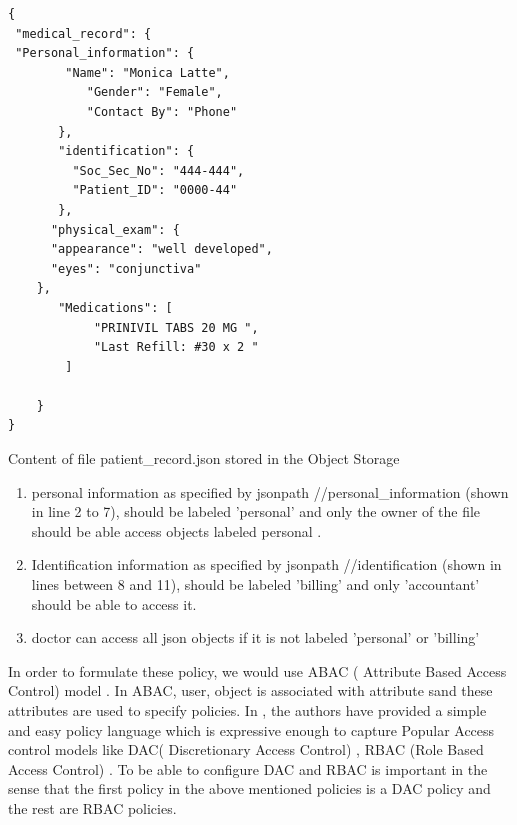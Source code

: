 \begin{listing}
\begin{verbatim}
{
 "medical_record": {
 "Personal_information": {
	    "Name": "Monica Latte",              
           "Gender": "Female",
           "Contact By": "Phone"
       },
       "identification": {
         "Soc_Sec_No": "444-444",
         "Patient_ID": "0000-44"
       },
      "physical_exam": {
	  "appearance": "well developed",
	  "eyes": "conjunctiva"
	},
       "Medications": [
            "PRINIVIL TABS 20 MG ",
            "Last Refill: #30 x 2 "
        ]    
      
    }
}

\end{verbatim}
\caption{ Content of file patient\_record.json stored in the Object Storage} 
\label{patient Record}
\end{listing}

\begin{enumerate}

  \item  personal information as specified by jsonpath //personal\_information (shown in line 2 to 7), should be labeled 'personal' and only the owner of the file should be able access objects labeled personal .

  \item Identification information as specified by jsonpath //identification (shown in lines between 8 and 11), should be labeled 'billing' and only 'accountant' should be able to access it.

  \item  doctor  can access all json objects if it is not labeled 'personal' or 'billing'
\end{enumerate}

In order to  formulate these policy, we would use ABAC ( Attribute Based Access Control) model \cite{abac}. In ABAC, user, object is associated with attribute sand these attributes are used to specify policies. In \cite{abac}, the authors have provided a simple and easy policy language which is expressive enough to capture Popular Access control models like  DAC( Discretionary Access Control) \cite{dac}, RBAC (Role Based Access Control) \cite{rbac}. To be able to configure DAC and RBAC is important in the sense that the first policy in the above mentioned policies is a DAC policy and the rest are RBAC policies.

